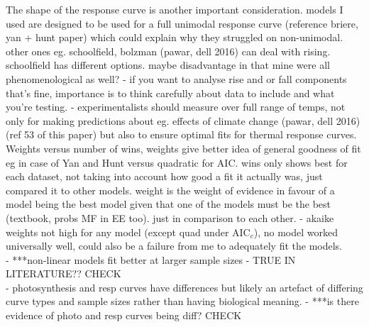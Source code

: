 \documentclass[11pt]{article}
\begin{document}
The shape of the response curve is another important consideration. models I used are designed to be used for a full unimodal response curve (reference briere, yan + hunt paper) which could explain why they struggled on non-unimodal. other ones eg. schoolfield, bolzman (pawar, dell 2016) can deal with rising. schoolfield has different options. maybe disadvantage in that mine were all phenomenological as well? - if you want to analyse rise and or fall components that's fine, importance is to think carefully about data to include and what you're testing.	- experimentalists should measure over full range of temps, not only for making predictions about eg. effects of climate change (pawar, dell 2016) (ref 53 of this paper) but also to ensure optimal fits for thermal response curves. 
\\ 

Weights versus number of wins, weights give better idea of general goodness of fit eg in case of Yan and Hunt versus quadratic for AIC. wins only shows best for each dataset, not taking into account how good a fit it actually was, just compared it to other models. weight is the weight of evidence in favour of a model being the best model given that one of the models must be the best (textbook, probs MF in EE too). just in comparison to each other. - akaike weights not high for any model (except quad under AIC$_c$), no model worked universally well, could also be a failure from me to adequately fit the models.
\\

- ***non-linear models fit better at larger sample sizes - TRUE IN LITERATURE?? CHECK
\\

- photosynthesis and resp curves have differences but likely an artefact of differing curve types and sample sizes rather than having biological meaning. 	- ***is there evidence of photo and resp curves being diff? CHECK
\\
\end{document}
